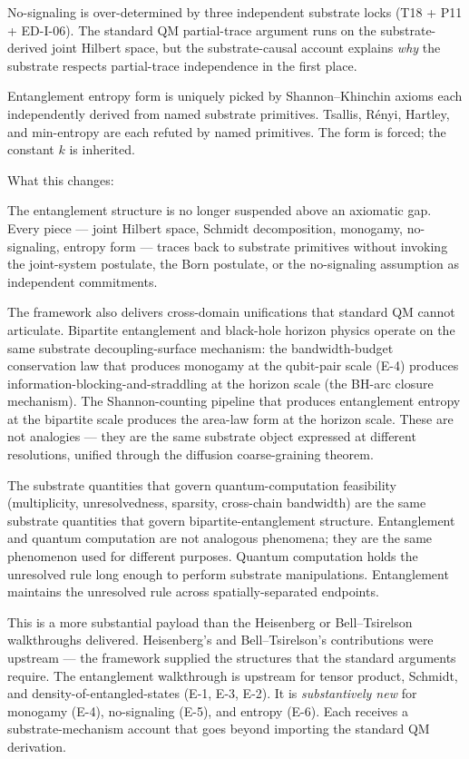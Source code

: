 \documentclass[11pt,a4paper]{article}
\begin{document}
No-signaling is over-determined by three independent substrate locks (T18 + P11 + ED-I-06). The standard QM partial-trace argument runs on the substrate-derived joint Hilbert space, but the substrate-causal account explains \emph{why} the substrate respects partial-trace independence in the first place.

Entanglement entropy form is uniquely picked by Shannon--Khinchin axioms each independently derived from named substrate primitives. Tsallis, R\'enyi, Hartley, and min-entropy are each refuted by named primitives. The form is forced; the constant $k$ is inherited.

What this changes:

The entanglement structure is no longer suspended above an axiomatic gap. Every piece --- joint Hilbert space, Schmidt decomposition, monogamy, no-signaling, entropy form --- traces back to substrate primitives without invoking the joint-system postulate, the Born postulate, or the no-signaling assumption as independent commitments.

The framework also delivers cross-domain unifications that standard QM cannot articulate. Bipartite entanglement and black-hole horizon physics operate on the same substrate decoupling-surface mechanism: the bandwidth-budget conservation law that produces monogamy at the qubit-pair scale (E-4) produces information-blocking-and-straddling at the horizon scale (the BH-arc closure mechanism). The Shannon-counting pipeline that produces entanglement entropy at the bipartite scale produces the area-law form at the horizon scale. These are not analogies --- they are the same substrate object expressed at different resolutions, unified through the diffusion coarse-graining theorem.

The substrate quantities that govern quantum-computation feasibility (multiplicity, unresolvedness, sparsity, cross-chain bandwidth) are the same substrate quantities that govern bipartite-entanglement structure. Entanglement and quantum computation are not analogous phenomena; they are the same phenomenon used for different purposes. Quantum computation holds the unresolved rule long enough to perform substrate manipulations. Entanglement maintains the unresolved rule across spatially-separated endpoints.

This is a more substantial payload than the Heisenberg or Bell--Tsirelson walkthroughs delivered. Heisenberg's and Bell--Tsirelson's contributions were upstream --- the framework supplied the structures that the standard arguments require. The entanglement walkthrough is upstream for tensor product, Schmidt, and density-of-entangled-states (E-1, E-3, E-2). It is \emph{substantively new} for monogamy (E-4), no-signaling (E-5), and entropy (E-6). Each receives a substrate-mechanism account that goes beyond importing the standard QM derivation.
\end{document}
